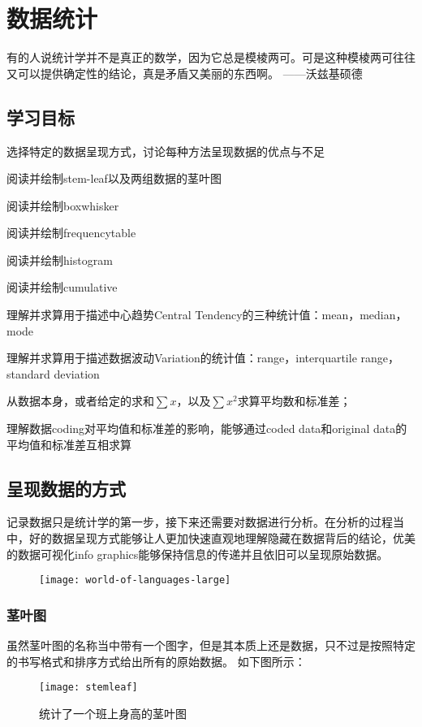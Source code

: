 \chapter{数据统计}
有的人说统计学并不是真正的数学，因为它总是模棱两可。可是这种模棱两可往往又可以提供确定性的结论，真是矛盾又美丽的东西啊。 \makebox{}\hfill——沃兹基硕德

\section*{学习目标}
\begin{todolist}
 \item 选择特定的数据呈现方式，讨论每种方法呈现数据的优点与不足
 \item 阅读并绘制\gls{stem-leaf}以及两组数据的茎叶图
 \item 阅读并绘制\gls{boxwhisker}
 \item 阅读并绘制\gls{frequencytable}
 \item 阅读并绘制\gls{histogram}
 \item 阅读并绘制\gls{cumulative}
 \item 理解并求算用于描述中心趋势Central Tendency的三种统计值：mean，median，mode
 \item 理解并求算用于描述数据波动Variation的统计值：range，interquartile range，standard deviation
 \item 从数据本身，或者给定的求和$\sum x$，以及$\sum x^2$求算平均数和标准差；
 \item 理解数据coding对平均值和标准差的影响，能够通过coded data和original data的平均值和标准差互相求算
\end{todolist}
\clearpage


\section{呈现数据的方式}
记录数据只是统计学的第一步，接下来还需要对数据进行分析。在分析的过程当中，好的数据呈现方式能够让人更加快速直观地理解隐藏在数据背后的结论，优美的数据可视化info graphics能够保持信息的传递并且依旧可以呈现原始数据。
\begin{figure}[H]
\centering
\texttt{[image: world-of-languages-large]}
\end{figure}

\subsection*{茎叶图}
虽然茎叶图的名称当中带有一个图字，但是其本质上还是数据，只不过是按照特定的书写格式和排序方式给出所有的原始数据。
如下图所示：
\begin{figure}[H]
\centering
\texttt{[image: stemleaf]}
\label{fig:stem-and-leaf}
\caption{统计了一个班上身高的茎叶图}
\end{figure}

